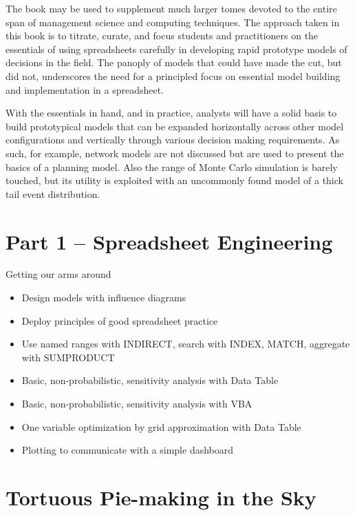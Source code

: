 \documentclass[
]{book}
\begin{document}
The book may be used to supplement much larger tomes devoted to the entire span of management science and computing techniques. The approach taken in this book is to titrate, curate, and focus students and practitioners on the essentials of using spreadsheets carefully in developing rapid prototype models of decisions in the field. The panoply of models that could have made the cut, but did not, underscores the need for a principled focus on essential model building and implementation in a spreadsheet.

With the essentials in hand, and in practice, analysts will have a solid basis to build prototypical models that can be expanded horizontally across other model configurations and vertically through various decision making requirements. As such, for example, network models are not discussed but are used to present the basics of a planning model. Also the range of Monte Carlo simulation is barely touched, but its utility is exploited with an uncommonly found model of a thick tail event distribution.

\hypertarget{part-1-spreadsheet-engineering}{%
\chapter*{Part 1 -- Spreadsheet Engineering}\label{part-1-spreadsheet-engineering}}

Getting our arms around

\begin{itemize}
\item
  Design models with influence diagrams
\item
  Deploy principles of good spreadsheet practice
\item
  Use named ranges with INDIRECT, search with INDEX, MATCH, aggregate with SUMPRODUCT
\item
  Basic, non-probabilistic, sensitivity analysis with Data Table
\item
  Basic, non-probabilistic, sensitivity analysis with VBA
\item
  One variable optimization by grid approximation with Data Table
\item
  Plotting to communicate with a simple dashboard
\end{itemize}

\hypertarget{spreadsheet1}{%
\chapter{Tortuous Pie-making in the Sky}\label{spreadsheet1}}
\end{document}
